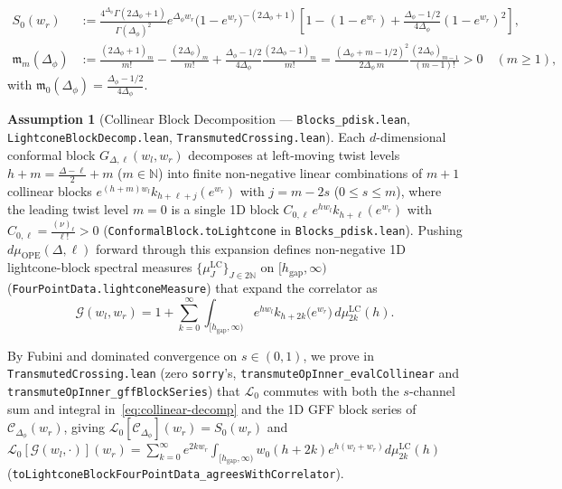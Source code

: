 \documentclass[10pt,a4paper]{article}
\theoremstyle{definition}
\newtheorem{assumption}{Assumption}
\begin{document}
\begin{align}
  \label{eq:S0-def}
  S_0(w_r) &:= \frac{4^{\Delta_\phi} \Gamma(2\Delta_\phi + 1)}{\Gamma(\Delta_\phi)^2} e^{\Delta_\phi w_r} \bigl(1 - e^{w_r}\bigr)^{-(2\Delta_\phi + 1)} \left[1 - (1 - e^{w_r}) + \frac{\Delta_\phi - 1/2}{4\Delta_\phi}(1 - e^{w_r})^2\right], \\
  \mathfrak{m}_m(\Delta_\phi) &:= \frac{(2\Delta_\phi + 1)_m}{m!} - \frac{(2\Delta_\phi)_m}{m!} + \frac{\Delta_\phi - 1/2}{4\Delta_\phi} \frac{(2\Delta_\phi - 1)_m}{m!} = \frac{(\Delta_\phi + m - 1/2)^2}{2\Delta_\phi \, m} \frac{(2\Delta_\phi)_{m-1}}{(m-1)!} > 0 \quad (m \ge 1),
\end{align}
with $\mathfrak{m}_0(\Delta_\phi) = \frac{\Delta_\phi - 1/2}{4\Delta_\phi}$.

\begin{assumption}[Collinear Block Decomposition --- \texttt{Blocks\_pdisk.lean}, \texttt{LightconeBlockDecomp.lean}, \texttt{TransmutedCrossing.lean}]
\label{assump:lightcone-blocks}
Each $d$-dimensional conformal block $G_{\Delta, \ell}(w_l, w_r)$ decomposes at left-moving twist levels $h + m = \frac{\Delta - \ell}{2} + m$ ($m \in \mathbb{N}$) into finite non-negative linear combinations of $m + 1$ collinear blocks $e^{(h + m) w_l} k_{h + \ell + j}(e^{w_r})$ with $j = m - 2s$ ($0 \le s \le m$), where the leading twist level $m = 0$ is a single 1D block $C_{0, \ell} \, e^{h w_l} k_{h + \ell}(e^{w_r})$ with $C_{0, \ell} = \frac{(\nu)_\ell}{\ell!} > 0$ (\texttt{ConformalBlock.toLightcone} in \texttt{Blocks\_pdisk.lean}). Pushing $d\mu_{\mathrm{OPE}}(\Delta, \ell)$ forward through this expansion defines non-negative 1D lightcone-block spectral measures $\{\mu^{\mathrm{LC}}_J\}_{J \in 2\mathbb{N}}$ on $[h_{\mathrm{gap}}, \infty)$ (\texttt{FourPointData.lightconeMeasure}) that expand the correlator as
\begin{equation}
  \label{eq:collinear-decomp}
  \mathcal{G}(w_l, w_r) = 1 + \sum_{k=0}^\infty \int_{[h_{\mathrm{gap}}, \infty)} e^{h w_l} k_{h + 2k}\bigl(e^{w_r}\bigr) \, d\mu^{\mathrm{LC}}_{2k}(h).
\end{equation}
\end{assumption}
By Fubini and dominated convergence on $s \in (0, 1)$, we prove in \texttt{TransmutedCrossing.lean} (zero \texttt{sorry}'s, \texttt{transmuteOp\-Inner\_evalCollinear} and \texttt{transmuteOp\-Inner\_gffBlockSeries}) that $\mathcal{L}_0$ commutes with both the $s$-channel sum and integral in~\eqref{eq:collinear-decomp} and the 1D GFF block series of $\mathcal{C}_{\Delta_\phi}(w_r)$, giving $\mathcal{L}_0[\mathcal{C}_{\Delta_\phi}](w_r) = S_0(w_r)$ and $\mathcal{L}_0[\mathcal{G}(w_l, \cdot)](w_r) = \sum_{k=0}^\infty e^{2k w_r} \!\int_{[h_{\mathrm{gap}}, \infty)} w_0(h + 2k) e^{h(w_l + w_r)} d\mu^{\mathrm{LC}}_{2k}(h)$ (\texttt{toLightconeBlockFourPointData\_agreesWithCorrelator}).
\end{document}
